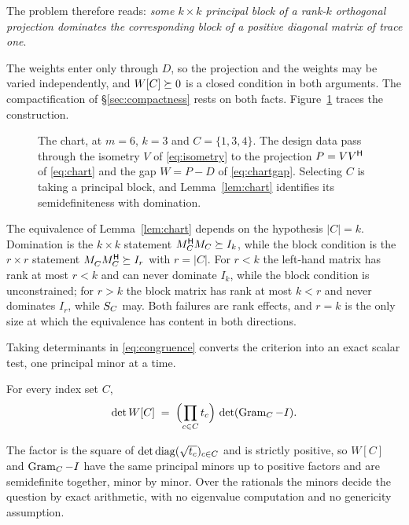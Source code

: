 The problem therefore reads: \emph{some $k\times k$ principal block of a
rank-$k$ orthogonal projection dominates the corresponding block of a
positive diagonal matrix of trace one}.

The weights enter only through $D$, so the projection and the weights may
be varied independently, and $W[C]\succeq0$ is a closed condition in both
arguments.  The compactification of \S\ref{sec:compactness} rests on both
facts.  Figure~\ref{fig:chart} traces the construction.

\begin{figure}[ht]
  \centering
  
  \caption{The chart, at $m=6$, $k=3$ and $C=\{1,3,4\}$.  The design data
  pass through the isometry $V$ of \eqref{eq:isometry} to the projection
  $P=VV^{\mathsf{H}}$ of \eqref{eq:chart} and the gap $W=P-D$ of
  \eqref{eq:chartgap}.  Selecting $C$ is taking a principal block, and
  Lemma~\ref{lem:chart} identifies its semidefiniteness with domination.}
  \label{fig:chart}
\end{figure}

\begin{remark}\label{rem:size}
The equivalence of Lemma~\ref{lem:chart} depends on the hypothesis
$\lvert C\rvert=k$.  Domination is the $k\times k$ statement
$M_C^{\mathsf{H}} M_C\succeq I_k$, while the block condition is the
$r\times r$ statement $M_C^{\vphantom{\mathsf{H}}}M_C\adj\psd I_r$ with
$r=\lvert C\rvert$.  For $r<k$ the left-hand matrix has rank at most
$r<k$ and can never dominate $I_k$, while the block condition is
unconstrained; for $r>k$ the block matrix has rank at most $k<r$ and
never dominates $I_r$, while $S_{C}$ may.  Both failures are rank effects,
and $r=k$ is the only size at which the equivalence has content in both
directions.
\end{remark}

Taking determinants in \eqref{eq:congruence} converts the criterion into
an exact scalar test, one principal minor at a time.

\begin{corollary}[Lean]\label{cor:minor}
For every index set $C$,
\[
  \det W[C]\;=\;\Bigl(\prod_{c\in C}t_c\Bigr)\,\det(\operatorname{Gram}_C-I).
\]
\end{corollary}

The factor is the square of $\det\operatorname{diag}(\sqrt{t_c})_{c\in C}$ and is
strictly positive, so $W[C]$ and $\operatorname{Gram}_C-I$ have the same principal
minors up to positive factors and are semidefinite together, minor by
minor.  Over the rationals the minors decide the question by exact
arithmetic, with no eigenvalue computation and no genericity assumption.


